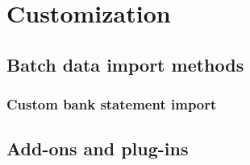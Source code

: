 


\part{Customization}
\label{part:Customization}

\chapter{Batch data import methods}

\section{Custom bank statement import}

\chapter{Add-ons and plug-ins}

